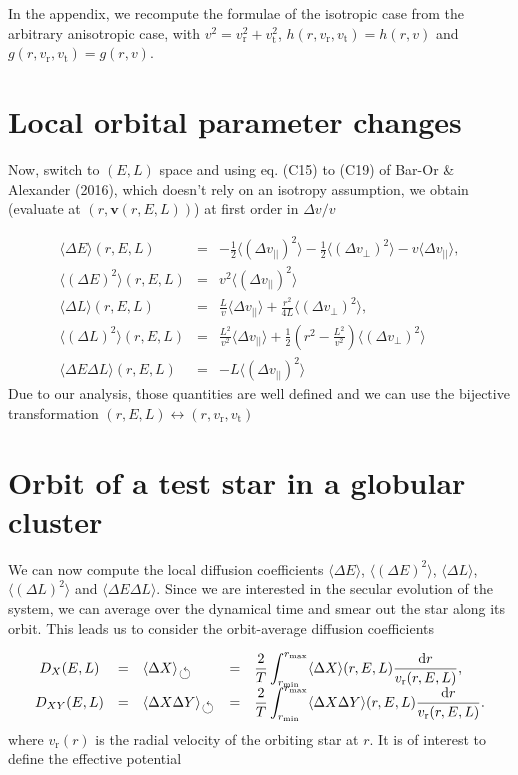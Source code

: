 \documentclass[11pt]{article}
\newcommand{\rt}{\mathrm{t}}
\newcommand{\rr}{\mathrm{r}}
\newcommand{\vr}{v_{\rr}}
\newcommand{\vt}{v_{\rt}}
\newcommand{\bv}{\boldsymbol{v}}
\newcommand{\dvPar}{\Delta v_{||}}
\newcommand{\dvPerp}{\Delta v_{\perp}}
\newcommand{\dvParAvrLoc}{\langle \dvPar \rangle}
\newcommand{\dvParSqAvrLoc}{\langle(\dvPar)^{2}\rangle}
\newcommand{\dvPerpSqAvrLoc}{\langle(\dvPerp)^{2}\rangle}
\newcommand{\rd}{{\rm{d}}}
\newcommand{\Dv}{\Delta v}
\newcommand{\DE}{\Delta E}
\newcommand{\DL}{\Delta L}
\newcommand{\DEAvr}{\langle\DE\rangle}
\newcommand{\DESqAvr}{\langle (\DE)^{2} \rangle}
\newcommand{\DLAvr}{\langle\DL\rangle}
\newcommand{\DLSqAvr}{\langle (\DL)^{2} \rangle}
\newcommand{\DEDLAvr}{\langle \DE \DL \rangle}
\newcommand{\DXAvr}{\langle\Delta X\rangle}
\newcommand{\DXYAvr}{\langle\Delta X \Delta Y\rangle}
\newcommand{\dX}{D_{X}}
\newcommand{\dXY}{D_{XY}}
\newcommand{\rmax}{r_{\max}}
\newcommand{\rmin}{r_{\min}}
\begin{document}
In the appendix, we recompute the formulae of the isotropic case from
the arbitrary anisotropic case, with $v^{2}=\vr^{2}+\vt^{2}$,
$h(r,\vr,\vt)=h(r,v)$ and $g(r,\vr,\vt)=g(r,v)$.

\section{Local orbital parameter changes}
\label{sec:Local_dE_dL}

Now, switch to $(E,L)$ space and using eq. (C15) to (C19) of Bar-Or
\& Alexander (2016), which doesn't rely on an isotropy assumption,
we obtain (evaluate at $(r,\bv(r,E,L))$) at first order
in $\Dv/v$

\begin{equation}
\begin{array}{ccl}
 \DEAvr(r,E,L) & =&\displaystyle{-\frac{1}{2}\dvParSqAvrLoc-\frac{1}{2}\dvPerpSqAvrLoc-v\dvParAvrLoc} ,\\
  
 \DESqAvr(r,E,L) & = &\displaystyle{v^{2}\dvParSqAvrLoc}\\
  \DLAvr(r,E,L) & =&\displaystyle{\frac{L}{v}\dvParAvrLoc+\frac{r^{2}}{4L}\dvPerpSqAvrLoc} ,\\
  
  \DLSqAvr(r,E,L) & = &\displaystyle{\frac{L^{2}}{v^{2}}\dvParAvrLoc+\frac{1}{2}\left(r^{2}-\frac{L^{2}}{v^{2}}\right)\dvPerpSqAvrLoc}\\
  
  \DEDLAvr(r,E,L) & = &\displaystyle{-L \dvParSqAvrLoc}   
\end{array}
\label{eq:DE_DL}
\end{equation}
Due to our analysis, those quantities are well defined and
we can use the bijective transformation $(r,E,L)\leftrightarrow(r,\vr,\vt)$

\section{Orbit of a test star in a globular cluster}
\label{sec:Orbit_globular_cluster}

We can now compute the local diffusion coefficients $\DEAvr$,
$\DESqAvr$, $\DLAvr$,
$\DLSqAvr$ and $\DEDLAvr$.
Since we are interested in the secular evolution of the system, we
can average over the dynamical time and smear out the star along its
orbit. This leads us to consider the orbit-average diffusion coefficients

\begin{equation}
\begin{array}{cclcl}
 \dX(E,L) & =& \DXAvr_{\leftturn} & =&\displaystyle{\frac{2}{T}\int_{\rmin}^{\rmax}\DXAvr(r,E,L)\frac{{\rd}r}{\vr(r,E,L)}} ,\\
  
  \dXY(E,L) & =& \DXYAvr_{\leftturn} & =&\displaystyle{\frac{2}{T}\int_{\rmin}^{\rmax}\DXYAvr(r,E,L)\frac{{\rd}r}{\vr(r,E,L)}} .
\end{array}
\label{eq:DE_DL}
\end{equation}
where $\vr(r)$ is the radial velocity of the orbiting star at $r$. It is of interest to define the effective potential
\end{document}
